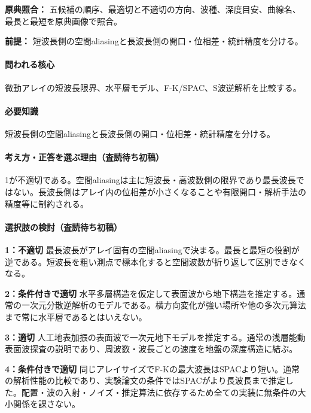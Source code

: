 \noindent\textbf{原典照合：} 五候補の順序、最適切と不適切の方向、波種、深度目安、曲線名、最長と最短を原典画像で照合。\par

\noindent\textbf{前提：} 短波長側の空間aliasingと長波長側の開口・位相差・統計精度を分ける。\par

\paragraph{問われる核心} 微動アレイの短波長限界、水平層モデル、F-K/SPAC、S波逆解析を比較する。

\paragraph{必要知識} 短波長側の空間aliasingと長波長側の開口・位相差・統計精度を分ける。

\paragraph{考え方・正答を選ぶ理由（査読待ち初稿）} 1が不適切である。空間aliasingは主に短波長・高波数側の限界であり最長波長ではない。長波長側はアレイ内の位相差が小さくなることや有限開口・解析手法の精度等に制約される。

\paragraph{選択肢の検討（査読待ち初稿）}\mbox{}\par

\noindent\textbf{1：不適切} 最長波長がアレイ固有の空間aliasingで決まる。最長と最短の役割が逆である。短波長を粗い測点で標本化すると空間波数が折り返して区別できなくなる。\par

\noindent\textbf{2：条件付きで適切} 水平多層構造を仮定して表面波から地下構造を推定する。通常の一次元分散逆解析のモデルである。横方向変化が強い場所や他の多次元算法まで常に水平層であるとはいえない。\par

\noindent\textbf{3：適切} 人工地表加振の表面波で一次元地下モデルを推定する。通常の浅層能動表面波探査の説明であり、周波数・波長ごとの速度を地盤の深度構造に結ぶ。\par

\noindent\textbf{4：条件付きで適切} 同じアレイサイズでF-Kの最大波長はSPACより短い。通常の解析性能の比較であり、実験論文の条件ではSPACがより長波長まで推定した。配置・波の入射・ノイズ・推定算法に依存するため全ての実装に無条件の大小関係を課さない。\par

